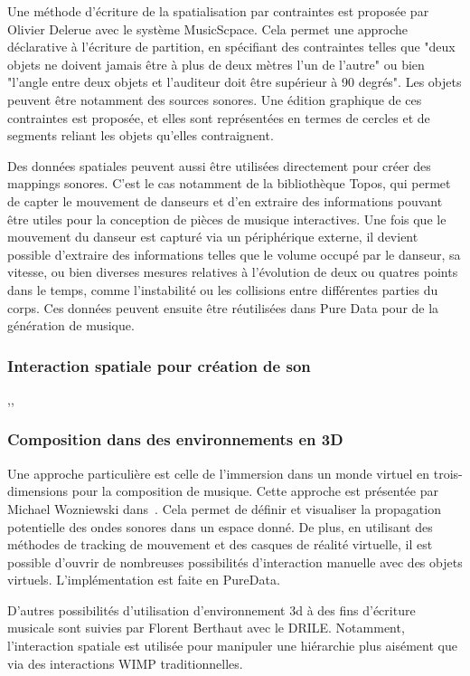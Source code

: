 \documentclass[french,12pt]{article}
\begin{document}
Une méthode d'écriture de la spatialisation par contraintes est proposée par Olivier Delerue avec le système MusicScpace\cite{delerue_spatialisation_2004}. Cela permet une approche déclarative à l'écriture de partition, en spécifiant des contraintes telles que "deux objets ne doivent jamais être à plus de deux mètres l'un de l'autre" ou bien "l'angle entre deux objets et l'auditeur doit être supérieur à 90 degrés". Les objets peuvent être notamment des sources sonores. Une édition graphique de ces contraintes est proposée, et elles sont représentées en termes de cercles et de segments reliant les objets qu'elles contraignent.

Des données spatiales peuvent aussi être utilisées directement pour créer des mappings sonores. C'est le cas notamment de la bibliothèque Topos\cite{naveda_topos_2014}, qui permet de capter le mouvement de danseurs et d'en extraire des informations pouvant être utiles pour la conception de pièces de musique interactives. Une fois que le mouvement du danseur est capturé via un périphérique externe, il devient possible d'extraire des informations telles que le volume occupé par le danseur, sa vitesse, ou bien diverses mesures relatives à l'évolution de deux ou quatres points dans le temps, comme l'instabilité ou les collisions entre différentes parties du corps. Ces données peuvent ensuite être réutilisées dans Pure Data pour de la génération de musique.
\subsubsection{Interaction spatiale pour création de son}
,\cite{sasamoto_controlling_2013},

\subsubsection{Composition dans des environnements en 3D}
Une approche particulière est celle de l'immersion dans un monde virtuel en trois-dimensions pour la composition de musique. Cette approche est présentée par Michael Wozniewski dans~\cite{wozniewski_framework_2006}. Cela permet de définir et visualiser la propagation potentielle des ondes sonores dans un espace donné. De plus, en utilisant des méthodes de tracking de mouvement et des casques de réalité virtuelle, il est possible d'ouvrir de nombreuses possibilités d'interaction manuelle avec des objets virtuels. L'implémentation est faite en PureData.

D'autres possibilités d'utilisation d'environnement 3d à des fins d'écriture musicale sont suivies par Florent Berthaut avec le DRILE\cite{berthaut_drile:_2010}. Notamment, l'interaction spatiale est utilisée pour manipuler une hiérarchie plus aisément que via des interactions WIMP traditionnelles.
\end{document}
